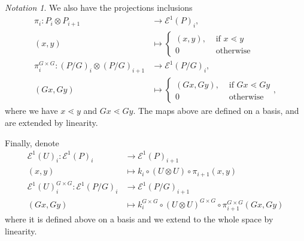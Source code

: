 \documentclass[10 pt]{amsart}
\theoremstyle{plain}
\theoremstyle{definition}
\theoremstyle{remark}
\numberwithin{equation}{section}
\theoremstyle{remark}
\newtheorem{note}[thm]{Notation}
\begin{document}
\begin{note}
We also have the projections inclusions
\begin{align*}
	\pi_i:P_i \otimes P_{i+1} & \rightarrow \mathcal E^1(P)_{i},\\
	(x, y) &\mapsto  \begin{cases}
	(x, y), &\text{ if }x\lessdot y\\
	0 &\text { otherwise}
\end{cases}\\
	\pi_i^{G\times G}: (P/G)_i \otimes (P/G)_{i+1} &\rightarrow\mathcal E^1(P/G)_i,\\
	(Gx, Gy) &\mapsto \begin{cases}
	(Gx, Gy), &\text{ if }Gx\lessdot Gy\\
	0 &\text { otherwise}
\end{cases},
\end{align*}
where we have $x \lessdot y$ and $Gx \lessdot Gy.$ The maps above are defined on a basis, and are extended by linearity.

Finally, denote
\begin{align*}
	\mathcal E^1(U)_i:\mathcal E^1(P)_i &\rightarrow \mathcal E^1(P)_{i+1}\\
	(x, y) &\mapsto k_i \circ (U \otimes U) \circ \pi_{i+1}(x, y)\\
\mathcal E^1(U)^{G\times G}_i:\mathcal E^1(P/G)_i & \rightarrow \mathcal E^1(P/G)_{i+1}\\
	(Gx, Gy) &\mapsto k^{G\times G}_i \circ (U \otimes U)^{G\times G} \circ \pi^{G\times G}_{i+1}(Gx, Gy)
\end{align*}
where it is defined above on a basis and we extend to the whole space by linearity.
\end{note}
\end{document}
